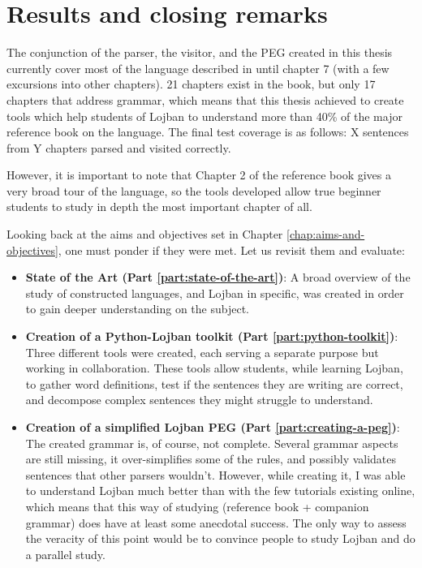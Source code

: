 \chapter{Results and closing remarks}

\vspace{0.5cm}

The conjunction of the parser, the visitor, and the PEG created in this thesis currently cover most of the language described in
 until chapter 7 (with a few excursions into other chapters). 21 chapters exist in the book,
but only 17 chapters that address grammar, which means that this thesis achieved to create tools which help students of
Lojban to understand more than 40\% of the major reference book on the language.
The final test coverage is as follows: X sentences from Y chapters parsed and visited correctly.\newline

However, it is important to note that Chapter 2 of the reference book gives a very broad tour of the language, so the tools
developed allow true beginner students to study in depth the most important chapter of all.\newline

Looking back at the aims and objectives set in Chapter \ref{chap:aims-and-objectives}, one must ponder if they were met. Let us
revisit them and evaluate:

\begin{itemize}
\item \textbf{State of the Art (Part \ref{part:state-of-the-art})}: A broad overview of the study of constructed languages, and Lojban
in specific, was created in order to gain deeper understanding on the subject.
\item \textbf{Creation of a Python-Lojban toolkit (Part \ref{part:python-toolkit})}: Three different tools were created, each
serving a separate purpose but working in collaboration. These tools allow students, while learning Lojban, to gather word definitions,
test if the sentences they are writing are correct, and decompose complex sentences they might struggle to understand.
\item \textbf{Creation of a simplified Lojban PEG (Part \ref{part:creating-a-peg})}: The created grammar is, of course, not complete.
Several grammar aspects are still missing, it over-simplifies some of the rules, and possibly validates sentences that other parsers wouldn't.
However, while creating it, I was able to understand Lojban much better than with the few tutorials existing online, which means that this way
of studying (reference book + companion grammar) does have at least some anecdotal success. The only way to assess the veracity of this point
would be to convince people to study Lojban and do a parallel study.
\end{itemize}

